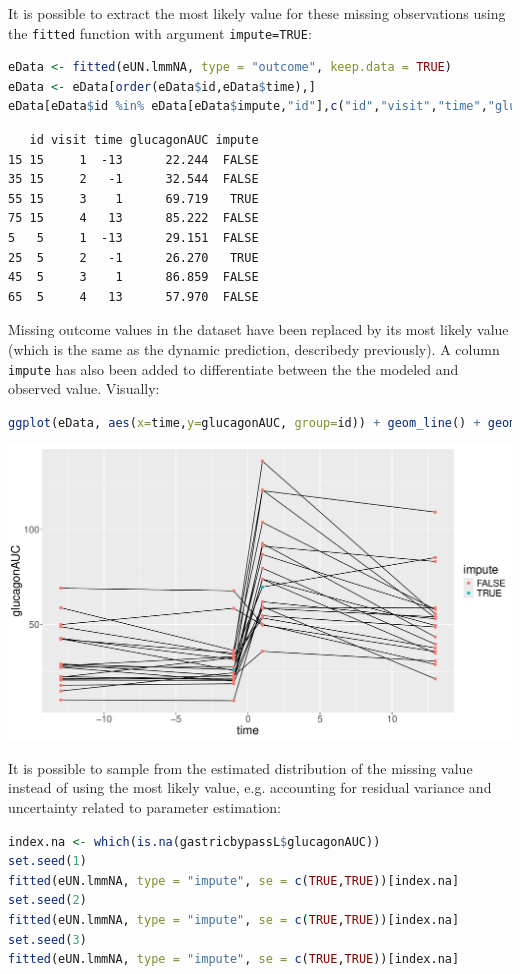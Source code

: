 \documentclass[12pt]{article}
\begin{document}
It is possible to extract the most likely value for these missing
observations using the \texttt{fitted} function with argument \texttt{impute=TRUE}:
\begin{lstlisting}[language=r,numbers=none]
eData <- fitted(eUN.lmmNA, type = "outcome", keep.data = TRUE)
eData <- eData[order(eData$id,eData$time),]
eData[eData$id %in% eData[eData$impute,"id"],c("id","visit","time","glucagonAUC","impute")]
\end{lstlisting}

\label{}
\begin{verbatim}
   id visit time glucagonAUC impute
15 15     1  -13      22.244  FALSE
35 15     2   -1      32.544  FALSE
55 15     3    1      69.719   TRUE
75 15     4   13      85.222  FALSE
5   5     1  -13      29.151  FALSE
25  5     2   -1      26.270   TRUE
45  5     3    1      86.859  FALSE
65  5     4   13      57.970  FALSE
\end{verbatim}


Missing outcome values in the dataset have been replaced by its most
likely value (which is the same as the dynamic prediction, describedy
previously). A column \texttt{impute} has also been added to differentiate
between the the modeled and observed value. Visually:
\begin{lstlisting}[language=r,numbers=none]
ggplot(eData, aes(x=time,y=glucagonAUC, group=id)) + geom_line() + geom_point(aes(color=impute))
\end{lstlisting}

\begin{center}
\includegraphics[trim={0 0 0 0},width=1\textwidth]{./figures/imputation.pdf}
\end{center}

It is possible to sample from the estimated distribution of the
missing value instead of using the most likely value, e.g. accounting
for residual variance and uncertainty related to parameter estimation:
\begin{lstlisting}[language=r,numbers=none]
index.na <- which(is.na(gastricbypassL$glucagonAUC))
set.seed(1)
fitted(eUN.lmmNA, type = "impute", se = c(TRUE,TRUE))[index.na]
set.seed(2)
fitted(eUN.lmmNA, type = "impute", se = c(TRUE,TRUE))[index.na]
set.seed(3)
fitted(eUN.lmmNA, type = "impute", se = c(TRUE,TRUE))[index.na]
\end{lstlisting}
\end{document}
